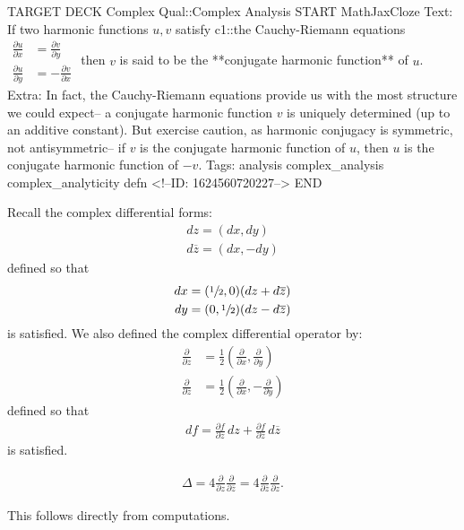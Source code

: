 \documentclass{memoir}
\begin{document}
\begin{anki}
TARGET DECK
Complex Qual::Complex Analysis
START
MathJaxCloze
Text: If two harmonic functions \(u,v\) satisfy {{c1::the Cauchy-Riemann equations
\(\begin{align*}
        	\frac{\partial u}{\partial x} &= \frac{\partial v}{\partial y} \\
        	\frac{\partial u}{\partial y} &= - \frac{\partial v}{\partial x} 
        \end{align*}\)}} 
	then \(v\) is said to be the **conjugate harmonic function** of \(u\). 
Extra: In fact, the Cauchy-Riemann equations provide us with the most structure we could expect-- a conjugate harmonic function \(v\) is uniquely determined (up to an additive constant). But exercise caution, as harmonic conjugacy is symmetric, not antisymmetric-- if \(v\) is the conjugate harmonic function of \(u\), then \(u\) is the conjugate harmonic function of \(-v\).
Tags: analysis complex_analysis complex_analyticity defn 
<!--ID: 1624560720227-->
END
\end{anki}

Recall the complex differential forms:
\begin{align*}
	dz = (dx, dy)\\
	d \overline{z} = (dx,-dy)
\end{align*}
defined so that
\begin{align*}
	dx = (\sfrac{1}{2},0) (dz + d \overline{z})\\
	dy = (0, \sfrac{1}{2}) (dz - d \overline{z})
\end{align*}
is satisfied. We also defined the complex differential operator by:
\begin{align*}
	\frac{\partial }{\partial z} &= \frac{1}{2}\left( \frac{\partial }{\partial x} , \frac{\partial }{\partial y}  \right)\\
	\frac{\partial }{\partial \overline{z}} &= \frac{1}{2} \left( \frac{\partial }{\partial x} , - \frac{\partial }{\partial y}  \right) 
\end{align*}
defined so that
\begin{align*}
	df = \frac{\partial f}{\partial z} \,d z + \frac{\partial f}{\partial \overline{z}} \,d \overline{z}
\end{align*}
is satisfied.

\begin{prop}
	\begin{align*}
		\Delta = 4 \frac{\partial }{\partial z} \frac{\partial }{\partial \overline{z}} = 4 \frac{\partial }{\partial \overline{z}} \frac{\partial }{\partial z} .
	\end{align*}
\end{prop}
This follows directly from computations.\\
\end{document}

